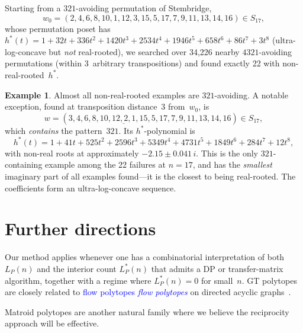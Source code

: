 \documentclass[11pt,reqno]{amsart}
\theoremstyle{definition}
\newtheorem{example}[theorem]{Example}
\newcommand{\Ehr}{L}
\newcommand{\Ehrstar}{L^{*}}
\newcommand{\defin}[1]{%
\relax\ifmmode%
\textcolor{blue}{#1}%
\else \textcolor{blue}{\emph{#1}}%
\fi%
}
\begin{document}
Starting from a $321$-avoiding permutation of Stembridge,
\[
  w_0 = (2,4,6,8,10,1,12,3,15,5,17,7,9,11,13,14,16) \in S_{17},
\]
whose permutation poset has
$h^*(t) = 1 + 32t + 336t^2 + 1420t^3 + 2534t^4 + 1946t^5 + 658t^6 + 86t^7 + 3t^8$
(ultra-log-concave but \emph{not} real-rooted),
we searched over 34{,}226 nearby $4321$-avoiding permutations
(within 3~arbitrary transpositions) and found exactly 22 with
non-real-rooted~$h^*$.

\begin{example}\label{ex:321containing}
Almost all non-real-rooted examples are $321$-avoiding.
A notable exception, found at transposition distance~3 from~$w_0$, is
\[
  w = (3,4,6,8,10,\underline{12,2,1},15,5,17,7,9,11,13,14,16) \in S_{17},
\]
which \emph{contains} the pattern~$321$. 
 Its $h^*$-polynomial is
\[
  h^*(t) = 1 + 41t + 525t^2 + 2596t^3 + 5349t^4 + 4731t^5 + 1849t^6 + 284t^7 + 12t^8,
\]
with non-real roots at approximately $-2.15 \pm 0.041\,i$.
This is the only $321$-containing example among the 22 failures
at $n = 17$, and has the \emph{smallest} imaginary part of all
examples found---it is the closest to being real-rooted.
The coefficients form an ultra-log-concave sequence.
\end{example}


\section{Further directions}\label{sec:furtherDirections}

Our method applies whenever one has a combinatorial interpretation
of both $\Ehr_P(n)$ and the interior count $\Ehrstar_P(n)$ that
admits a DP or transfer-matrix algorithm, together with a regime
where $\Ehrstar_P(n) = 0$ for small~$n$.
GT polytopes are closely related to \defin{flow polytopes} on directed acyclic
graphs~\cite{LiuMeszarosDizier2019flow}.

Matroid polytopes are another natural family
where we believe the reciprocity approach will be effective.




\end{document}
